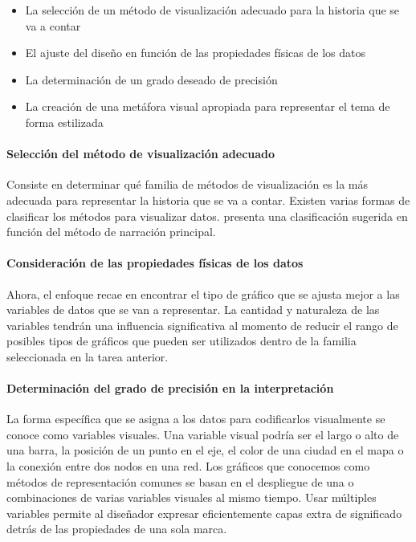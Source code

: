 \begin{itemize}
  \item La selección de un método de visualización adecuado para la historia que se va a contar
  \item El ajuste del diseño en función de las propiedades físicas de los datos
  \item La determinación de un grado deseado de precisión
  \item La creación de una metáfora visual apropiada para representar el tema de forma estilizada
\end{itemize}

\paragraph{Selección del método de visualización adecuado}

Consiste en determinar qué familia de métodos de visualización es la más adecuada para representar la historia que se va a contar. Existen varias formas de clasificar los métodos para visualizar datos.  presenta una clasificación sugerida en función del método de narración principal.

\paragraph{Consideración de las propiedades físicas de los datos}

Ahora, el enfoque recae en encontrar el tipo de gráfico que se ajusta mejor a las variables de datos que se van a representar. La cantidad y naturaleza de las variables tendrán una influencia significativa al momento de reducir el rango de posibles tipos de gráficos que pueden ser utilizados dentro de la familia seleccionada en la tarea anterior.

\paragraph{Determinación del grado de precisión en la interpretación}

La forma específica que se asigna a los datos para codificarlos visualmente se conoce como variables visuales. Una variable visual podría ser el largo o alto de una barra, la posición de un punto en el eje, el color de una ciudad en el mapa o la conexión entre dos nodos en una red. Los gráficos que conocemos como métodos de representación comunes se basan en el despliegue de una o combinaciones de varias variables visuales al mismo tiempo. Usar múltiples variables permite al diseñador expresar eficientemente capas extra de significado detrás de las propiedades de una sola marca. 

